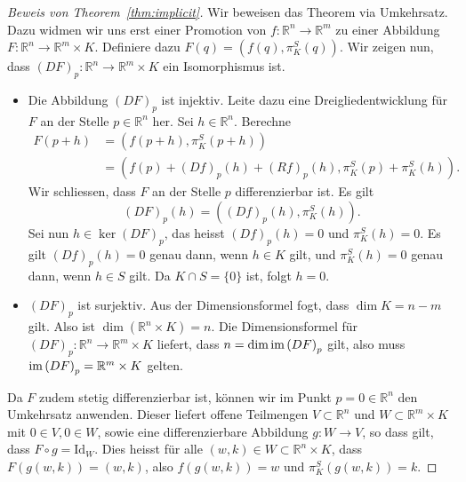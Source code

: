 \documentclass[../main.tex]{subfiles}
\begin{document}
\begin{proof}[Beweis von Theorem~\ref{thm:implicit}]
  Wir beweisen das Theorem via Umkehrsatz.
  Dazu widmen wir uns erst einer Promotion
  von $f \colon \mathbb{R}^n \to \mathbb{R}^m$ 
  zu einer Abbildung
  $F \colon \mathbb{R}^n \to \mathbb{R}^m \times K$.
  Definiere dazu $F(q) = (f(q), \pi_K^S(q))$.
  Wir zeigen nun, dass ${(DF)}_p \colon \mathbb{R}^n \to
  \mathbb{R}^m \times K$ 
  ein Isomorphismus ist.
  \begin{itemize}
    \item Die Abbildung ${(DF)}_p$
      ist injektiv.
      Leite dazu eine Dreigliedentwicklung für $F$ an
      der Stelle $p \in \mathbb{R}^n$ her.
      Sei $h \in \mathbb{R}^n$.
      Berechne
      \begin{align*}
        F(p+h)
        & = (f(p + h), \pi_K^S(p + h)) \\
        &= (f(p) + {(Df)}_p(h) + {(Rf)}_p(h), \pi_K^S(p) + \pi_K^S(h)).
      \end{align*}
      Wir schliessen, dass $F$
      an der Stelle  $p$ differenzierbar ist.
      Es gilt \[{(DF)}_p(h) = ({(Df)}_p(h), \pi_K^S(h)).\]
      Sei nun $h \in \ker {(DF)}_p$, das heisst
      ${(Df)}_p(h) = 0$ und $\pi_K^S(h) = 0$.
      Es gilt ${(Df)}_p(h) = 0$ genau dann,
      wenn $h \in K$ gilt, und $\pi_K^S(h) = 0$ genau dann,
      wenn $h \in S$ gilt. Da $K \cap S = \{0\}$ ist, folgt $h = 0$.
    \item ${(DF)}_p$ ist surjektiv.
      Aus der Dimensionsformel fogt, dass $\dim K = n - m$ gilt.
      Also ist $\dim (\mathbb{R}^n \times K) = n$.
      Die Dimensionsformel für 
      ${(DF)}_p \colon \mathbb{R}^n \to \mathbb{R}^m \times K$ 
      liefert, dass $n = \dim \operatorname{im} {(DF)}_p$ gilt, also muss
      $\operatorname{im} {(DF)}_p = \mathbb{R}^m \times K$ gelten.
  \end{itemize}
  Da $F$ zudem stetig differenzierbar ist,
  können wir im Punkt $p = 0 \in \mathbb{R}^n$ den Umkehrsatz anwenden.
  Dieser liefert offene Teilmengen
  $V \subset \mathbb{R}^n$ und $W \subset \mathbb{R}^m \times K$ 
  mit $0 \in V, 0 \in W$,
  sowie eine differenzierbare Abbildung $g \colon W \to V$,
  so dass gilt, dass $F \circ g = \text{Id}_W$.
  Dies heisst für alle $(w, k) \in W \subset \mathbb{R}^n \times K$,
  dass $F(g(w, k)) = (w, k)$, also
  $f(g(w, k)) = w$ 
  und $\pi_K^S(g(w, k)) = k$.


\end{proof}
\end{document}
